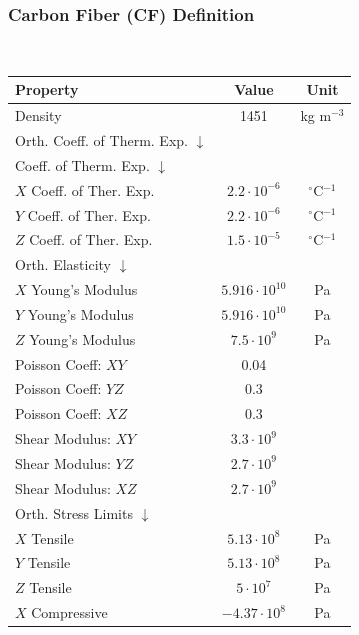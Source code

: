 \documentclass{amsdtx}
\begin{document}
\subsubsection{Carbon Fiber (CF) Definition}
~\\[-3em]

\begin{table}[H]
\centering
\renewcommand{\arraystretch}{1.4}
\begin{tabular}{l|c|c}
\bf Property & \bf Value & \bf Unit \\\hline\hline
Density & 1451 & kg m$^{-3}$ \\\hline
Orth. Coeff. of Therm. Exp.	$\downarrow$ & & \\\hline
\quad Coeff. of Therm. Exp. $\downarrow$ & & \\\hline
\quad \quad $X$ Coeff. of Ther. Exp. & $2.2\cdot10^{-6}$ & $^\circ$C$^{-1}$ \\\hline
\quad \quad $Y$ Coeff. of Ther. Exp. & $2.2\cdot10^{-6}$ & $^\circ$C$^{-1}$ \\\hline
\quad \quad $Z$ Coeff. of Ther. Exp. & $1.5\cdot10^{-5}$ & $^\circ$C$^{-1}$ \\\hline
Orth. Elasticity	$\downarrow$ & & \\\hline
\quad $X$ Young's Modulus & $5.916\cdot 10^{10}$ & Pa \\\hline
\quad $Y$ Young's Modulus & $5.916\cdot 10^{10}$ & Pa\\\hline
\quad $Z$ Young's Modulus & $7.5\cdot 10^{9}$ & Pa\\\hline
\quad Poisson Coeff: $XY$ & 0.04 & \\\hline
\quad Poisson Coeff: $YZ$ & 0.3 & \\\hline
\quad Poisson Coeff: $XZ$ & 0.3 & \\\hline
\quad Shear Modulus: $XY$ & $3.3\cdot 10^9$ & \\\hline
\quad Shear Modulus: $YZ$ & $2.7\cdot 10^9$ & \\\hline
\quad Shear Modulus: $XZ$ & $2.7\cdot 10^9$ & \\\hline
Orth. Stress Limits	$\downarrow$ & & \\\hline
\quad $X$ Tensile & $5.13\cdot 10^8$ & Pa\\\hline
\quad $Y$ Tensile & $5.13\cdot 10^8$ & Pa\\\hline
\quad $Z$ Tensile & $5\cdot 10^7$ & Pa\\\hline
\quad $X$ Compressive & $-4.37\cdot 10^8$ & Pa\\\hline


\end{tabular}
\end{table}
\end{document}
